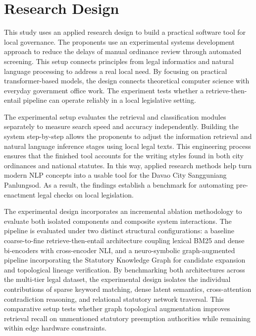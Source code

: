 \section{Research Design}
\label{sec:research_design}
    This study uses an applied research design to build a practical software tool for local governance. The proponents use an experimental systems development approach to reduce the delays of manual ordinance review through automated screening. This setup connects principles from legal informatics and natural language processing to address a real local need. By focusing on practical transformer-based models, the design connects theoretical computer science with everyday government office work. The experiment tests whether a retrieve-then-entail pipeline can operate reliably in a local legislative setting.

    The experimental setup evaluates the retrieval and classification modules separately to measure search speed and accuracy independently. Building the system step-by-step allows the proponents to adjust the information retrieval and natural language inference stages using local legal texts. This engineering process ensures that the finished tool accounts for the writing styles found in both city ordinances and national statutes. In this way, applied research methods help turn modern NLP concepts into a usable tool for the Davao City Sangguniang Panlungsod. As a result, the findings establish a benchmark for automating pre-enactment legal checks on local legislation.

    The experimental design incorporates an incremental ablation methodology to evaluate both isolated components and composite system interactions. The pipeline is evaluated under two distinct structural configurations: a baseline coarse-to-fine retrieve-then-entail architecture coupling lexical BM25 and dense bi-encoders with cross-encoder NLI, and a neuro-symbolic graph-augmented pipeline incorporating the Statutory Knowledge Graph for candidate expansion and topological lineage verification. By benchmarking both architectures across the multi-tier legal dataset, the experimental design isolates the individual contributions of sparse keyword matching, dense latent semantics, cross-attention contradiction reasoning, and relational statutory network traversal. This comparative setup tests whether graph topological augmentation improves retrieval recall on unmentioned statutory preemption authorities while remaining within edge hardware constraints.

